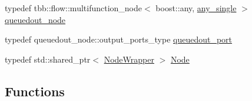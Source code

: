 \begin{DoxyCompactItemize}
\item 
typedef tbb\+::flow\+::multifunction\+\_\+node$<$ boost\+::any, \hyperlink{namespace_wire_cell_tbb_add86809a147ec9695fadae148a7059ea}{any\+\_\+single} $>$ \hyperlink{namespace_wire_cell_tbb_ad74c1ae0395c6232cc5f54579a928498}{queuedout\+\_\+node}
\item 
typedef queuedout\+\_\+node\+::output\+\_\+ports\+\_\+type \hyperlink{namespace_wire_cell_tbb_a1812565243cb4597d2215ad672e1e991}{queuedout\+\_\+port}
\item 
typedef std\+::shared\+\_\+ptr$<$ \hyperlink{class_wire_cell_tbb_1_1_node_wrapper}{Node\+Wrapper} $>$ \hyperlink{namespace_wire_cell_tbb_aa7b6ff37a20e0174babf0614286bb59f}{Node}
\end{DoxyCompactItemize}
\subsection*{Functions}
